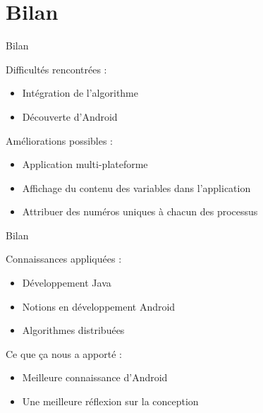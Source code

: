 \documentclass{beamer}
\begin{document}
    \section{Bilan}
    \begin{frame}{Bilan}

	  \begin{block}{Difficultés rencontrées :}
	  \begin{itemize}
	   \item Intégration de l'algorithme
       \item Découverte d'Android
	  \end{itemize}
	  \end{block}
	  \begin{block}{Améliorations possibles :}
	  \begin{itemize}
	   \item Application multi-plateforme
       \item Affichage du contenu des variables dans l'application
       \item Attribuer des numéros uniques à chacun des processus
	  \end{itemize}
	  \end{block}
    \end{frame}

    \begin{frame}{Bilan}
	  \begin{block}{Connaissances appliquées :}
	  \begin{itemize}
	   \item Développement Java
       \item Notions en développement Android
       \item Algorithmes distribuées
	  \end{itemize}
	  \end{block}
	  \begin{block}{Ce que ça nous a apporté :}
	  \begin{itemize}
	   \item Meilleure connaissance d’Android
       \item Une meilleure réflexion sur la conception
	  \end{itemize}
	  \end{block}
    \end{frame}
\end{document}
